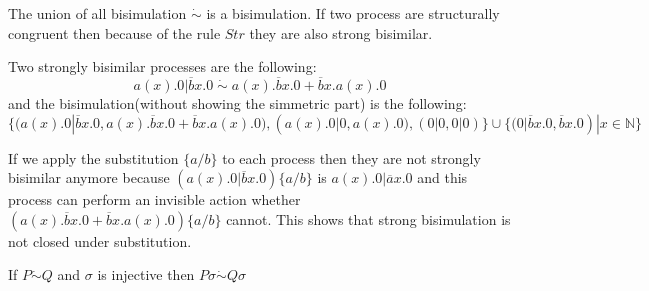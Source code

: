 The union of all bisimulation $\dot{\sim}$ is a bisimulation. If two process are structurally congruent then because of the rule $Str$ they are also strong bisimilar.

\begin{example}
  Two strongly bisimilar processes are the following:
  \[
    a(x).0|\overline{b}x.0\; \dot{\sim}\; a(x).\overline{b}x.0 + \overline{b}x.a(x).0
  \]
  and the bisimulation(without showing the simmetric part) is  the following:
  \[
    \{(a(x).0|\overline{b}x.0, a(x).\overline{b}x.0 + \overline{b}x.a(x).0),(a(x).0|0,a(x).0), (0|0,0|0)\} \cup \{(0|\overline{b}x.0,\overline{b}x.0)|x\in \mathbb{N}\} 
  \]

  If we apply the substitution $\{a/b\}$ to each process then they are not strongly bisimilar anymore because $(a(x).0|\overline{b}x.0)\{a/b\}$ is $a(x).0|\overline{a}x.0$ and this process can perform an invisible action whether $(a(x).\overline{b}x.0 + \overline{b}x.a(x).0)\{a/b\}$ cannot. This shows that strong bisimulation is not closed under substitution.
\end{example}

\begin{proposition}
  If $P \dot{\sim} Q$ and $\sigma$ is injective then $P\sigma \dot{\sim} Q\sigma$
% 	
\end{proposition}

